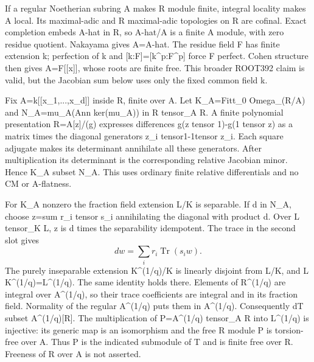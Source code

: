 \documentclass[11pt]{article}
\begin{document}
If a regular Noetherian subring A makes R module finite, integral locality makes A local. Its maximal-adic and R maximal-adic topologies on R are cofinal. Exact completion embeds A-hat in R, so A-hat/A is a finite A module, with zero residue quotient. Nakayama gives A=A-hat. The residue field F has finite extension k; perfection of k and [k:F]=[k\textasciicircum{}p:F\textasciicircum{}p] force F perfect. Cohen structure then gives A=F[[x]], whose roots are finite free. This broader ROOT392 claim is valid, but the Jacobian sum below uses only the fixed common field k.

Fix A=k[[x\_1,...,x\_d]] inside R, finite over A. Let K\_A=Fitt\_0 Omega\_(R/A) and N\_A=mu\_A(Ann ker(mu\_A)) in R tensor\_A R. A finite polynomial presentation R=A[z]/(g) expresses differences g(z tensor 1)-g(1 tensor z) as a matrix times the diagonal generators z\_i tensor1-1tensor z\_i. Each square adjugate makes its determinant annihilate all these generators. After multiplication its determinant is the corresponding relative Jacobian minor. Hence K\_A subset N\_A. This uses ordinary finite relative differentials and no CM or A-flatness.

For K\_A nonzero the fraction field extension L/K is separable. If d in N\_A, choose z=sum r\_i tensor s\_i annihilating the diagonal with product d. Over L tensor\_K L, z is d times the separability idempotent. The trace in the second slot gives
\[
d w=\sum_i r_i\operatorname{Tr}(s_i w).
\]
The purely inseparable extension K\textasciicircum{}(1/q)/K is linearly disjoint from L/K, and L K\textasciicircum{}(1/q)=L\textasciicircum{}(1/q). The same identity holds there. Elements of R\textasciicircum{}(1/q) are integral over A\textasciicircum{}(1/q), so their trace coefficients are integral and in its fraction field. Normality of the regular A\textasciicircum{}(1/q) puts them in A\textasciicircum{}(1/q). Consequently dT subset A\textasciicircum{}(1/q)[R]. The multiplication of P=A\textasciicircum{}(1/q) tensor\_A R into L\textasciicircum{}(1/q) is injective: its generic map is an isomorphism and the free R module P is torsion-free over A. Thus P is the indicated submodule of T and is finite free over R. Freeness of R over A is not asserted.
\end{document}
